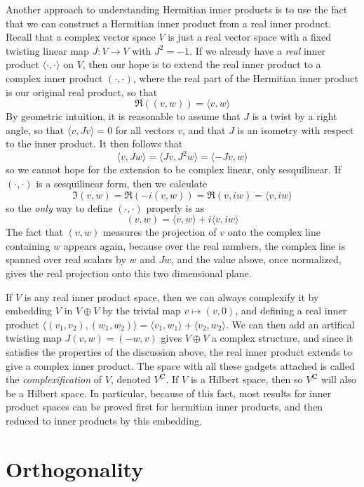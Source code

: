 Another approach to understanding Hermitian inner products is to use the fact that we can construct a Hermitian inner product from a real inner product. Recall that a complex vector space $V$ is just a real vector space with a fixed twisting linear map $J: V \to V$ with $J^2 = -1$. If we already have a {\it real} inner product $\langle \cdot, \cdot \rangle$ on $V$, then our hope is to extend the real inner product to a complex inner product $(\cdot,\cdot)$, where the real part of the Hermitian inner product is our original real product, so that
%
\[ \Re((v,w)) = \langle v, w \rangle \]
%
By geometric intuition, it is reasonable to assume that $J$ is a twist by a right angle, so that $\langle v, Jv \rangle = 0$ for all vectors $v$, and that $J$ is an isometry with respect to the inner product. It then follows that
%
\[ \langle v, Jw \rangle = \langle Jv, J^2w \rangle = \langle -Jv, w \rangle \]
%
so we cannot hope for the extension to be complex linear, only sesquilinear. If $(\cdot, \cdot)$ is a sesquilinear form, then we calculate
%
\[ \Im (v,w) = \Re(-i (v,w)) = \Re (v,iw) = \langle v, iw \rangle \]
%
so the {\it only} way to define $(\cdot, \cdot)$ properly is as
%
\[ (v,w) = \langle v, w \rangle + i \langle v, iw \rangle \]
%
The fact that $(v,w)$ measures the projection of $v$ onto the complex line containing $w$ appears again, because over the real numbers, the complex line is spanned over real scalars by $w$ and $Jw$, and the value above, once normalized, gives the real projection onto this two dimensional plane.

If $V$ is any real inner product space, then we can always complexify it by embedding $V$ in $V \oplus V$ by the trivial map $v \mapsto (v,0)$, and defining a real inner product $\langle (v_1,v_2), (w_1,w_2) \rangle = \langle v_1,w_1 \rangle + \langle v_2,w_2 \rangle$. We can then add an artifical twisting map $J(v,w) = (-w,v)$ gives $V \oplus V$ a complex structure, and since it satisfies the properties of the discussion above, the real inner product extends to give a complex inner product. The space with all these gadgets attached is called the \emph{complexification} of $V$, denoted $V^\mathbf{C}$. If $V$ is a Hilbert space, then so $V^\mathbf{C}$ will also be a Hilbert space. In particular, because of this fact, most results for inner product spaces can be proved first for hermitian inner products, and then reduced to inner products by this embedding.

\section{Orthogonality}

